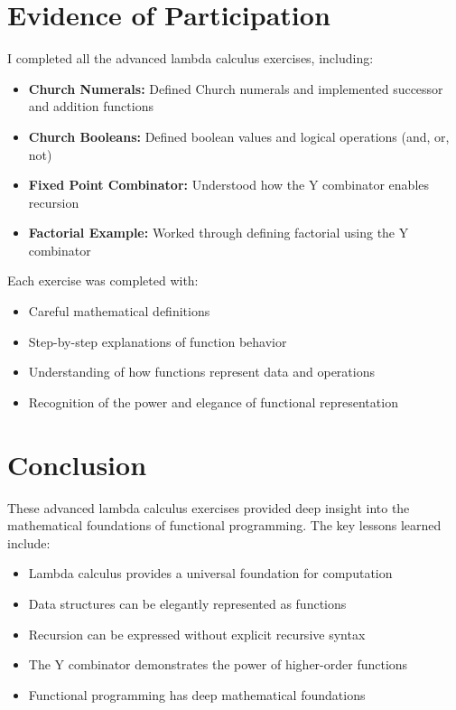 \documentclass{article}
\theoremstyle{plain}
\theoremstyle{definition}
\theoremstyle{remark}
\begin{document}
\section{Evidence of Participation}

I completed all the advanced lambda calculus exercises, including:

\begin{itemize}
\item \textbf{Church Numerals:} Defined Church numerals and implemented successor and addition functions
\item \textbf{Church Booleans:} Defined boolean values and logical operations (and, or, not)
\item \textbf{Fixed Point Combinator:} Understood how the Y combinator enables recursion
\item \textbf{Factorial Example:} Worked through defining factorial using the Y combinator
\end{itemize}

Each exercise was completed with:
\begin{itemize}
\item Careful mathematical definitions
\item Step-by-step explanations of function behavior
\item Understanding of how functions represent data and operations
\item Recognition of the power and elegance of functional representation
\end{itemize}

\section{Conclusion}\label{conclusion}

These advanced lambda calculus exercises provided deep insight into the mathematical foundations of functional programming. The key lessons learned include:

\begin{itemize}
\item Lambda calculus provides a universal foundation for computation
\item Data structures can be elegantly represented as functions
\item Recursion can be expressed without explicit recursive syntax
\item The Y combinator demonstrates the power of higher-order functions
\item Functional programming has deep mathematical foundations
\end{itemize}
\end{document}
